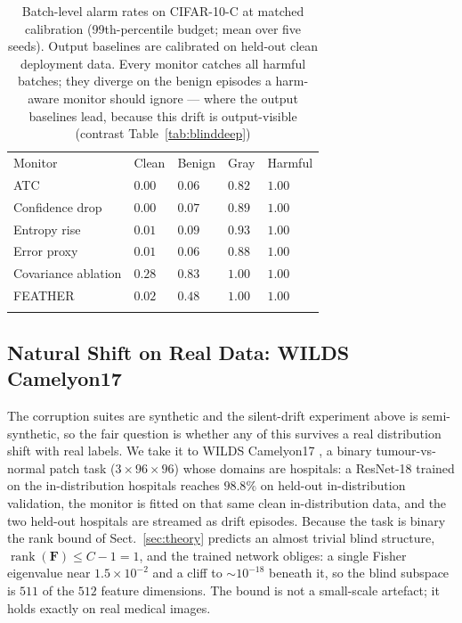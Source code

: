 \documentclass[graybox]{SNmult}
\begin{document}
\begin{table}[!t]
\caption{Batch-level alarm rates on CIFAR-10-C at matched calibration
(99th-percentile budget; mean over five seeds). Output baselines are
calibrated on held-out clean deployment data. Every monitor catches all
harmful batches; they diverge on the benign episodes a harm-aware
monitor should ignore --- where the output baselines lead, because this
drift is output-visible (contrast Table~\ref{tab:blinddeep})}
\label{tab:alarms}
\begin{tabular}{p{3.3cm}p{1.7cm}p{1.7cm}p{1.7cm}p{1.7cm}}
\hline\noalign{\smallskip}
Monitor & Clean & Benign & Gray & Harmful \\
\noalign{\smallskip}\svhline\noalign{\smallskip}
ATC \cite{garg2022atc} & $0.00$ & $\mathbf{0.06}$ & $0.82$ & $1.00$ \\
Confidence drop & $0.00$ & $0.07$ & $0.89$ & $1.00$ \\
Entropy rise & $0.01$ & $0.09$ & $0.93$ & $1.00$ \\
Error proxy \cite{amoukou2024sequential} & $0.01$ & $\mathbf{0.06}$ & $0.88$ & $1.00$ \\
\noalign{\smallskip}
Covariance ablation & $0.28$ & $0.83$ & $1.00$ & $1.00$ \\
FEATHER & $0.02$ & $0.48$ & $1.00$ & $1.00$ \\
\noalign{\smallskip}\hline\noalign{\smallskip}
\end{tabular}
\end{table}

\subsection{Natural Shift on Real Data: WILDS Camelyon17}
\label{sec:wilds}

The corruption suites are synthetic and the silent-drift experiment above is
semi-synthetic, so the fair question is whether any of this survives a real
distribution shift with real labels. We take it to WILDS Camelyon17
\cite{koh2021wilds}, a binary tumour-vs-normal patch task
($3\times96\times96$) whose domains are hospitals: a ResNet-18 trained on the
in-distribution hospitals reaches $98.8\%$ on held-out in-distribution
validation, the monitor is fitted on that same clean in-distribution data, and
the two held-out hospitals are streamed as drift episodes. Because the task is
binary the rank bound of Sect.~\ref{sec:theory} predicts an almost trivial
blind structure, $\operatorname{rank}(\mathbf{F}) \le C-1 = 1$, and the trained
network obliges: a single Fisher eigenvalue near $1.5\times10^{-2}$ and a cliff
to $\sim10^{-18}$ beneath it, so the blind subspace is $511$ of the $512$
feature dimensions. The bound is not a small-scale artefact; it holds exactly
on real medical images.
\end{document}
